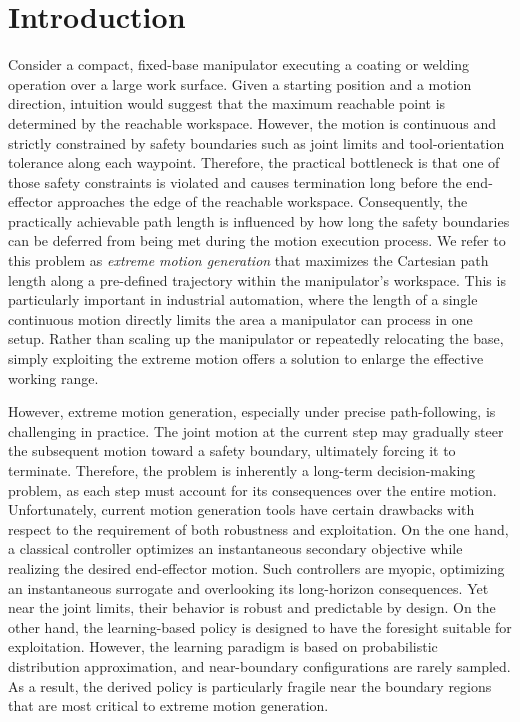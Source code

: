 \documentclass{svproc}
\begin{document}
\section{Introduction}
Consider a compact, fixed-base manipulator executing a coating or welding operation over a large work surface. Given a starting position and a motion direction, intuition would suggest that the maximum reachable point is determined by the reachable workspace. However, the motion is continuous and strictly constrained by safety boundaries such as joint limits and tool-orientation tolerance along each waypoint. Therefore, the practical bottleneck is that one of those safety constraints is violated and causes termination long before the end-effector approaches the edge of the reachable workspace. Consequently, the practically achievable path length is influenced by how long the safety boundaries can be deferred from being met during the motion execution process. We refer to this problem as \textit{extreme motion generation} that maximizes the Cartesian path length along a pre-defined trajectory within the manipulator's workspace. This is particularly important in industrial automation, where the length of a single continuous motion directly limits the area a manipulator can process in one setup. Rather than scaling up the manipulator or repeatedly relocating the base, simply exploiting the extreme motion offers a solution to enlarge the effective working range.

However, extreme motion generation, especially under precise path-following, is challenging in practice. The joint motion at the current step may gradually steer the subsequent motion toward a safety boundary, ultimately forcing it to terminate. Therefore, the problem is inherently a long-term decision-making problem, as each step must account for its consequences over the entire motion. Unfortunately, current motion generation tools have certain drawbacks with respect to the requirement of both robustness and exploitation. On the one hand, a classical controller optimizes an instantaneous secondary objective while realizing the desired end-effector motion. Such controllers are myopic, optimizing an instantaneous surrogate and overlooking its long-horizon consequences. Yet near the joint limits, their behavior is robust and predictable by design. On the other hand, the learning-based policy is designed to have the foresight suitable for exploitation. However, the learning paradigm is based on probabilistic distribution approximation, and near-boundary configurations are rarely sampled. As a result, the derived policy is particularly fragile near the boundary regions that are most critical to extreme motion generation.
\end{document}
